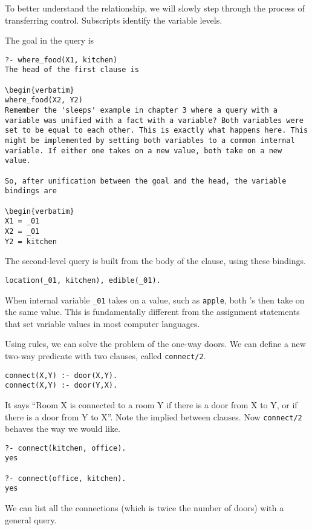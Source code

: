 To better understand the relationship, we will slowly step through the process
of transferring control. Subscripts identify the variable levels.

The goal in the query is

\begin{verbatim}
?- where_food(X1, kitchen)
The head of the first clause is

\begin{verbatim}
where_food(X2, Y2)
Remember the 'sleeps' example in chapter 3 where a query with a variable was unified with a fact with a variable? Both variables were set to be equal to each other. This is exactly what happens here. This might be implemented by setting both variables to a common internal variable. If either one takes on a new value, both take on a new value.

So, after unification between the goal and the head, the variable bindings are

\begin{verbatim}
X1 = _01
X2 = _01
Y2 = kitchen
\end{verbatim}
The second-level query is built from the body of the clause, using these bindings.

\begin{verbatim}
location(_01, kitchen), edible(_01).
\end{verbatim}
When internal variable \verb'_01' takes on a value, such as \verb'apple', both
's then take on the same value. This is fundamentally different from the
assignment statements that set variable values in most computer languages.


Using rules, we can solve the problem of the one-way doors. We can define a new
two-way predicate with two clauses, called \verb'connect/2'.

\begin{verbatim}
connect(X,Y) :- door(X,Y).
connect(X,Y) :- door(Y,X).
\end{verbatim}
It says ``Room X is connected to a room Y if there is a door from X to Y, or if
there is a door from Y to X''. Note the implied  between clauses. Now
\verb'connect/2' behaves the way we would like.

\begin{verbatim}
?- connect(kitchen, office).
yes

?- connect(office, kitchen).
yes
\end{verbatim}
We can list all the connections (which is twice the number of doors) with a
general query.

